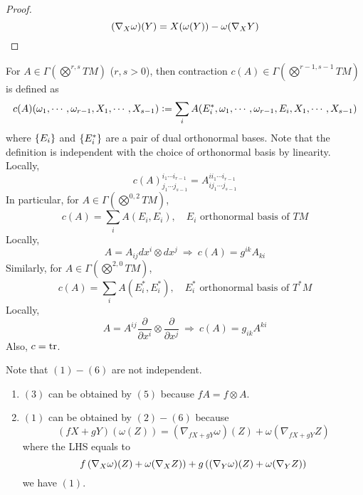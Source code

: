 \begin{enumerate}[label=\arabic{*}.]
\begin{proof}
\begin{equation*}
			(\nabla_X\omega)(Y) = X(\omega(Y)) - \omega(\nabla_XY)\qedhere
		\end{equation*}
	\end{proof}
	\begin{rmk}
		For $A \in \Gamma(\bigotimes^{r,s}TM)$ ($r,s > 0$), then contraction $c(A) \in \Gamma(\bigotimes^{r-1,s-1}TM)$ is defined as
		\begin{equation*}
			c(A)(\omega_1,\cdots,\omega_{r-1},X_1,\cdots, X_{s-1}) \vcentcolon= \sum_i A(E_i^*,\omega_1,\cdots,\omega_{r-1},E_i,X_1,\cdots, X_{s-1})
		\end{equation*}
		where $\left\{E_i\right\}$ and $\left\{E_i^*\right\}$ are a pair of dual orthonormal bases. Note that the definition is independent with the choice of orthonormal basis by linearity. Locally,
		\begin{equation*}
			c(A)^{i_1 \cdots i_{r-1}}_{j_1 \cdots j_{s-1}} = A^{i i_1 \cdots i_{r-1}}_{ij_1 \cdots j_{s-1}}
		\end{equation*}
		In particular, for $A \in \Gamma(\bigotimes^{0,2}TM)$,
		\begin{equation*}
			c(A) = \sum_iA(E_i,E_i),\quad E_i \text{ orthonormal basis of }TM
		\end{equation*}
		Locally,
		\begin{equation*}
			A = A_{ij}dx^i \otimes dx^j~\Rightarrow~c(A) = g^{ik}A_{ki}
		\end{equation*}
		Similarly, for $A \in \Gamma(\bigotimes^{2,0}TM)$,
		\begin{equation*}
			c(A) = \sum_iA(E_i^*,E_i^*),\quad E_i^* \text{ orthonormal basis of }T^*M
		\end{equation*}
		Locally,
		\begin{equation*}
			A = A^{ij}\frac{\partial}{\partial x^i} \otimes \frac{\partial}{\partial x^j}~\Rightarrow~c(A) = g_{ik}A^{ki}
		\end{equation*}
		Also, $c = \operatorname{tr}$.
	\end{rmk}
	\begin{rmk}
		Note that $(1)-(6)$ are not independent.
		\begin{enumerate}[label=(\roman*)]
			\item $(3)$ can be obtained by $(5)$ because $fA = f\otimes A$.
			\item $(1)$ can be obtained by $(2)-(6)$ because
			\begin{equation*}
				(fX+gY)(\omega(Z)) = (\nabla_{fX+gY}\omega)(Z) + \omega(\nabla_{fX+gY}Z)
			\end{equation*}
			where the LHS equals to
			\begin{equation*}
				f\left(\nabla_{X}\omega)(Z) + \omega(\nabla_{X}Z)\right)+g\left((\nabla_{Y}\omega)(Z) + \omega(\nabla_{Y}Z)\right)
			\end{equation*}
			we have $(1)$.
		\end{enumerate}
	\end{rmk}


\end{enumerate}
